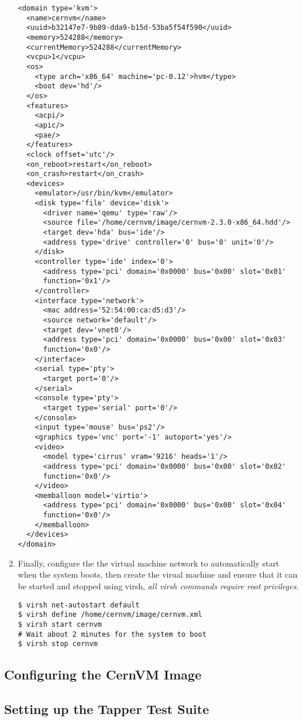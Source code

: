 \begin{enumerate}
\begin{lstlisting}
<domain type='kvm'>
  <name>cernvm</name>
  <uuid>b32147e7-9b89-dda9-b15d-53ba5f54f590</uuid>
  <memory>524288</memory>
  <currentMemory>524288</currentMemory>
  <vcpu>1</vcpu>
  <os>
    <type arch='x86_64' machine='pc-0.12'>hvm</type>
    <boot dev='hd'/>
  </os>
  <features>
    <acpi/>
    <apic/>
    <pae/>
  </features>
  <clock offset='utc'/>
  <on_reboot>restart</on_reboot>
  <on_crash>restart</on_crash>
  <devices>
    <emulator>/usr/bin/kvm</emulator>
    <disk type='file' device='disk'>
      <driver name='qemu' type='raw'/>
      <source file='/home/cernvm/image/cernvm-2.3.0-x86_64.hdd'/>
      <target dev='hda' bus='ide'/>
      <address type='drive' controller='0' bus='0' unit='0'/>
    </disk>
    <controller type='ide' index='0'>
      <address type='pci' domain='0x0000' bus='0x00' slot='0x01' 
      function='0x1'/>
    </controller>
    <interface type='network'>
      <mac address='52:54:00:ca:d5:d3'/>
      <source network='default'/>
      <target dev='vnet0'/>
      <address type='pci' domain='0x0000' bus='0x00' slot='0x03' 
      function='0x0'/>
    </interface>
    <serial type='pty'>
      <target port='0'/>
    </serial>
    <console type='pty'>
      <target type='serial' port='0'/>
    </console>
    <input type='mouse' bus='ps2'/>
    <graphics type='vnc' port='-1' autoport='yes'/>
    <video>
      <model type='cirrus' vram='9216' heads='1'/>
      <address type='pci' domain='0x0000' bus='0x00' slot='0x02'
      function='0x0'/>
    </video>
    <memballoon model='virtio'>
      <address type='pci' domain='0x0000' bus='0x00' slot='0x04'
      function='0x0'/>
    </memballoon>
  </devices>
</domain>
\end{lstlisting}

\item Finally, configure the the virtual machine network to automatically start when the system boots, then create the virual machine
and ensure that it can be started and stopped using virsh, \emph{all virsh commands require root privileges}.
\lstset{caption= Configure the Virtual Machine and Verify it Works}
\begin{lstlisting}
$ virsh net-autostart default
$ virsh define /home/cernvm/image/cernvm.xml
$ virsh start cernvm
# Wait about 2 minutes for the system to boot
$ virsh stop cernvm
\end{lstlisting}
\end{enumerate}

\subsection{Configuring the CernVM Image}
\subsection{Setting up the Tapper Test Suite}